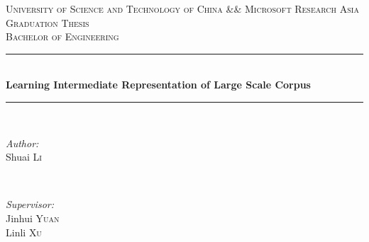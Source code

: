 \documentclass[a4paper]{book}
\begin{document}
\begin{titlepage}

\newcommand{\HRule}{\rule{\linewidth}{0.5mm}} %

\center %
 

\textsc{\LARGE University of Science and Technology of China \&\&
  Microsoft Research Asia}\\[1.5cm] %
\textsc{\Large Graduation Thesis}\\[0.5cm] %
\textsc{\large Bachelor of Engineering}\\[0.5cm] %


\HRule \\[0.4cm]
{ \huge \bfseries Learning Intermediate Representation of Large Scale
  Corpus}\\[0.4cm] %
\HRule \\[1.5cm]
 

\begin{minipage}{0.4\textwidth}
\begin{flushleft} \large
\emph{Author:}\\
Shuai \textsc{Li} %
\end{flushleft}
\end{minipage}
~
\begin{minipage}{0.4\textwidth}
\begin{flushright} \large
\emph{Supervisor:} \\
Jinhui \textsc{Yuan}\\ %
Linli \textsc{Xu} %
\end{flushright}
\end{minipage}\\[4cm]


\end{titlepage}
\end{document}
